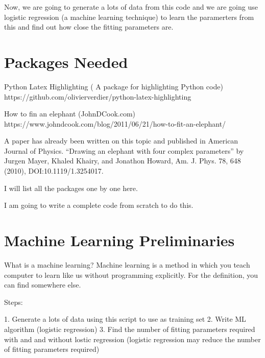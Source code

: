 \documentclass[]{article}
\begin{document}
Now, we are going to generate a lots of data from this code and we are going use logistic regression (a machine learning technique) to learn the paramerters from this and find out how  close the fitting parameters are.

\section{Packages Needed}

Python Latex Highlighting ( A package for highlighting Python code)
https://github.com/olivierverdier/python-latex-highlighting 

How to fin an elephant (JohnDCook.com)
https://www.johndcook.com/blog/2011/06/21/how-to-fit-an-elephant/

A paper has already been written on this topic and published in American Journal of Physics.
“Drawing an elephant with four complex parameters” by Jurgen Mayer, Khaled Khairy, and Jonathon Howard,  Am. J. Phys. 78, 648 (2010), DOI:10.1119/1.3254017.

I will list all the packages one by one here.

I am going to write a complete code from scratch to do this.


\section{Machine Learning Preliminaries}

What is a machine learning?
Machine learning is a method in which you teach computer to learn like us without programming explicitly. For the definition, you can find somewhere else.

Steps:

1. Generate a lots of data using this script to use as training set
2. Write ML algorithm (logistic regression)
3. Find the number of fitting parameters required with and and without lostic regression (logistic regression may reduce the number of fitting parameters required)
\end{document}
